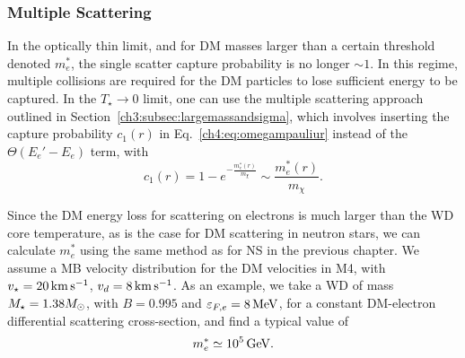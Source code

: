 \subsubsection{Multiple Scattering}
\label{ch4:subsubsec:mselectrons}

In the optically thin limit, and for DM masses larger than a certain threshold denoted $m_e^*$, the single scatter capture probability is no longer $\sim 1$. In this regime, multiple collisions are required for the DM particles to lose sufficient energy to be captured. 
In the $T_\star\rightarrow0$ limit, one can use the multiple scattering approach outlined in Section~\ref{ch3:subsec:largemassandsigma}, which involves inserting the capture probability $c_1(r)$ in Eq.~\ref{ch4:eq:omegampauliur} instead of the $\Theta\left(E_e' - E_e\right)$ term, with
\begin{equation}
c_1(r) = 1-e^{-\frac{m^*_e(r)}{m_\chi}}\sim \frac{m^*_e(r)}{m_\chi}.
\end{equation}


Since the DM energy loss for scattering on electrons 
is much larger than the WD core temperature, as is the case for DM scattering in neutron stars, we can calculate $m_e^*$ using the same method as for NS in the previous chapter.  We assume a MB velocity distribution for the DM velocities in M4, with $v_\star=20{\rm \,km}{\rm \,s}^{-1}$, $v_d=8{\rm \,km}{\rm \,s}^{-1}$. As an example, we take a WD of mass $M_\star=1.38M_\odot$, with $B=0.995$ and $\varepsilon_{F,e}=8{\rm \,MeV}$, for a constant DM-electron differential scattering cross-section, and find a typical value of 
\begin{equation}
m^*_e \simeq 10^5 {\rm \,GeV}. 
\end{equation}


